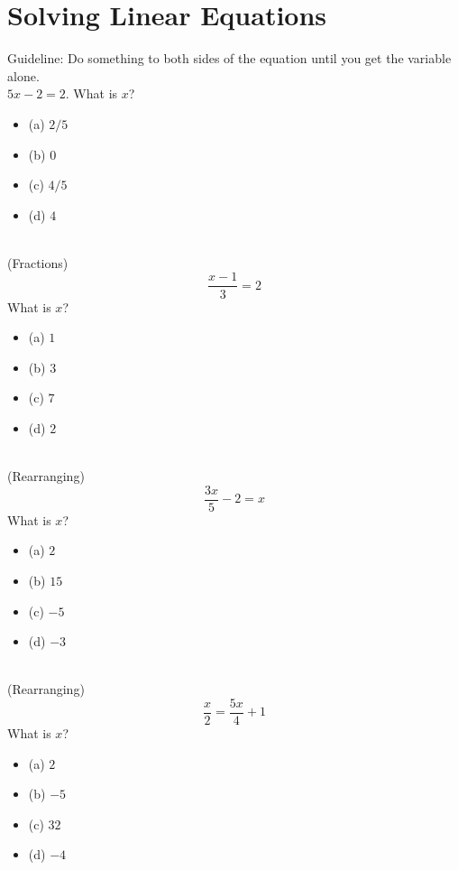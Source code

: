 \documentclass{article}
\begin{document}
\section{Solving Linear Equations}
Guideline: Do something to both sides of the equation until you get the variable alone.\\[20pt]
$5x-2 = 2$. What is $x$?
\begin{itemize}
\item[](a) $2/5$
\item[](b) $0$
\item[](c) $4/5$
\item[](d) $4$
\end{itemize} \hrulefill \\[10pt]
(Fractions)
$$\frac{x-1}{3} = 2$$
What is $x$?
\begin{itemize}
\item[](a) $1$
\item[](b) $3$
\item[](c) $7$
\item[](d) $2$
\end{itemize} \hrulefill \\[10pt]
(Rearranging)
$$\frac{3x}{5} - 2 = x$$
What is $x$?
\begin{itemize}
\item[](a) $2$
\item[](b) $15$
\item[](c) $-5$
\item[](d) $-3$
\end{itemize} \hrulefill \\[10pt]\newpage
\noindent
(Rearranging)
$$\frac{x}{2} = \frac{5x}{4} + 1$$
What is $x$?
\begin{itemize}
\item[](a) $2$
\item[](b) $-5$
\item[](c) $32$
\item[](d) $-4$
\end{itemize} \hrulefill \\[10pt]
\end{document}
